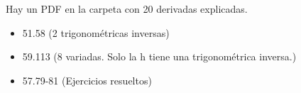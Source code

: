 \begin{problem}
Hay un PDF en la carpeta con 20 derivadas explicadas.
\solution
\end{problem}

\begin{problem}

\begin{itemize}
	\item 51.58 (2 trigonométricas inversas)
	\item 59.113 (8 variadas. Solo la h tiene una trigonométrica inversa.)
	\item 57.79-81 (Ejercicios resueltos)
\end{itemize}

\solution
\end{problem}
